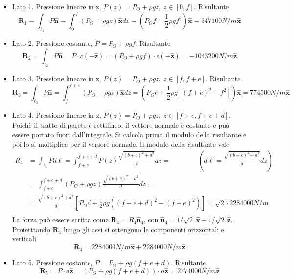 \begin{itemize}
 \item Lato 1. Pressione lineare in z, $P(z) = P_O + \rho g z , \ z \in [0,f] $. Risultante
   \begin{equation}
   \bm{R}_1 = \int_{\ell_1} P \bm{\hat{n}} = \int_{0}^{f} (P_O + \rho g z) \bm{\hat{x}} dz = 
     \displaystyle\left(P_O  f + \frac{1}{2} \rho g f^2 \right) \bm{\hat{x}} = 347100 N/m \bm{\hat{x}}
   \end{equation}
 \item Lato 2. Pressione costante, $P = P_O + \rho g f$. Risultante 
   \begin{equation}
     \bm{R}_2 = \int_{\ell_2} P \bm{\hat{n}} = P\cdot c (-\bm{\hat{z}})=(P_O + \rho g f)\cdot c(-\bm{\hat{z}}) = - 1043200 N/m \bm{\hat{z}}
   \end{equation}
 \item Lato 3. Pressione lineare in z, $P(z) = P_O + \rho g z , \  z \in [f,f+e]$. Risultante
   \begin{equation}
     \bm{R}_3 = \int_{\ell_3} P \bm{\hat{n}} = \int_{f}^{f+e} (P_O + \rho g z) \bm{\hat{x}} dz = 
     \displaystyle\left(P_O e + \frac{1}{2} \rho g \left[(f+e)^2 - f^2\right]\right) \bm{\hat{x}} = 774500 N/m \bm{\hat{x}}
   \end{equation}
 \item Lato 4. Pressione lineare in z, $P(z)  = P_O + \rho g z , \ z \in [f+e,f+e+d]$. Poichè il tratto di parete è rettilineo, il vettore normale è costante e può essere portato fuori dall'integrale. Si calcola prima il modulo della risultante e poi lo si moltiplica per il versore normale. Il modulo della risultante vale
   \begin{equation}
   \begin{aligned}
      {R}_4 & = \int_{\ell_4} P d\ell = \int_{f+e}^{f+e+d} P(z) \frac{\sqrt{(b+c)^2+d^2}}{d} dz = \qquad \qquad \text{$\displaystyle\left(d\ell = \frac{\sqrt{(b+c)^2+d^2}}{d} dz \right)$} \\
     & = \int_{f+e}^{f+e+d} (P_O + \rho g z) \frac{\sqrt{(b+c)^2+d^2}}{d} dz = \\
     & = \frac{\sqrt{(b+c)^2+d^2}}{d}\left[ P_O d + \frac{1}{2} \rho g \left((f+e+d)^2-(f+e)^2 \right)  \right] = 
     \sqrt{2} \cdot 2284000 N/m \\
   \end{aligned}
   \end{equation}
   La forza può essere scritta come $\bm{R}_4 = R_4 \bm{\hat{n}}_4$, con
   $\bm{\hat{n}}_4 = 1/\sqrt{2} \ \hat{\bm{x}} + 1/\sqrt{2} \ \hat{\bm{z}}$. Proietttando $\bm{R}_4$ lungo gli assi si ottengono le componenti orizzontali
   e verticali
   \begin{equation}
     \bm{R}_4 = 2284000 N/m \bm{\hat{x}} + 2284000 N/m \bm{\hat{z}}
   \end{equation}
 \item Lato 5. Pressione costante, $P = P_O + \rho g (f+e+d)$. Risultante 
   \begin{equation}
     \bm{R}_5 = P\cdot a \bm{\hat{z}} =(P_O + \rho g (f+e+d))\cdot a \bm{\hat{z}} =  2774000 N/m \bm{\hat{z}}
   \end{equation}
 
\end{itemize}

